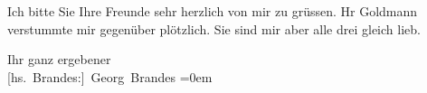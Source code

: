 \pstart
           Ich bitte Sie Ihre Freunde sehr herzlich von mir zu grüssen. Hr Goldmann verstummte mir gegenüber plötzlich. Sie sind mir aber
               alle drei gleich lieb.\pend
           
\pstart
           Ihr ganz ergebener{\\[\baselineskip]}\spacefill\mbox{{[}hs. Brandes:{]} Georg Brandes}\pend
           \leftskip=0em{}\endnumbering{}  \newcommand{\dateiname}{L00701}\newcommand{\titel}{Georg Brandes an Arthur Schnitzler, [13. 7. 1897]}\newcommand{\editorInnen}{Martin Anton Müller und Gerd-Hermann Susen}
